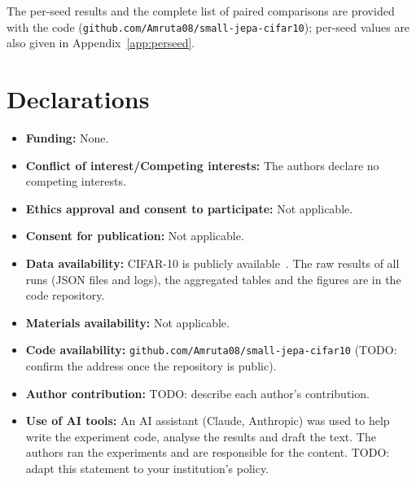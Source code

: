 \documentclass[pdflatex,sn-basic]{sn-jnl}%
\begin{document}
The per-seed results and the complete list of paired comparisons are provided with the code (\texttt{github.com/Amruta08/\allowbreak small-jepa-cifar10}); per-seed values are also given in Appendix~\ref{app:perseed}.


\section*{Declarations}
\begin{itemize}
\item \textbf{Funding:} None.
\item \textbf{Conflict of interest/Competing interests:} The authors declare no competing interests.
\item \textbf{Ethics approval and consent to participate:} Not applicable.
\item \textbf{Consent for publication:} Not applicable.
\item \textbf{Data availability:} CIFAR-10 is publicly available~\cite{krizhevsky2009cifar}. The raw results of all runs (JSON files and logs), the aggregated tables and the figures are in the code repository.
\item \textbf{Materials availability:} Not applicable.
\item \textbf{Code availability:} \texttt{github.com/Amruta08/\allowbreak small-jepa-cifar10} (TODO: confirm the address once the repository is public).
\item \textbf{Author contribution:} TODO: describe each author's contribution.
\item \textbf{Use of AI tools:} An AI assistant (Claude, Anthropic) was used to help write the experiment code, analyse the results and draft the text. The authors ran the experiments and are responsible for the content. TODO: adapt this statement to your institution's policy.
\end{itemize}
\end{document}
